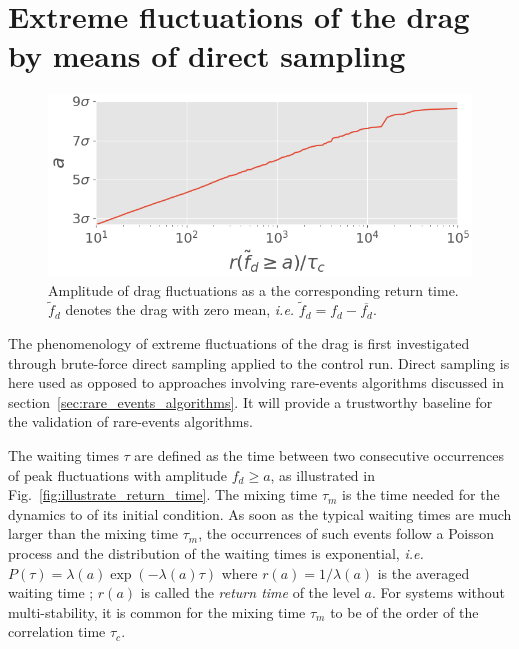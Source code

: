 \documentclass{jfm}
\newcommand{\EL}[1]{{\color{myred}{#1}}}
\begin{document}
\section{Extreme fluctuations of the drag by means of direct sampling}
\label{sec:direct_sampling}



\begin{figure}
	\centering
	\includegraphics[width=.6\linewidth]{return_time/return_time.png}
	\caption{Amplitude of drag fluctuations as a \EL{function of} the corresponding return time. $\tilde{f}_d$ denotes the drag with zero mean, \textit{i.e.} $\tilde{f}_d = f_d - \overline{f_d}$.
	}
	\label{fig:return_time_instant}
\end{figure}

%
The phenomenology of extreme fluctuations of the drag is first investigated through brute-force direct sampling applied to the control run.
Direct sampling is here used as opposed to approaches involving rare-events algorithms discussed in section~\ref{sec:rare_events_algorithms}.
It will provide a trustworthy baseline for the validation of rare-events algorithms. 

The waiting times $\tau$ are defined as the time between two consecutive occurrences of peak fluctuations with amplitude $f_d \geq a$, as illustrated in Fig.~\ref{fig:illustrate_return_time}.
The mixing time $\tau_m$ is the time needed for the dynamics to \EL{lose the memory} of its initial condition.
As soon as the typical waiting times are much larger than the mixing time $\tau_m$, the occurrences of such events follow a Poisson process and the distribution of the waiting times is exponential, \emph{i.e.} $P(\tau)=\lambda(a)\exp(-\lambda(a)\tau)$ where $r(a)=1/\lambda(a)$ is the averaged waiting time \citep{lestang_computing_2018}; $r(a)$ is called the {\it return time} of the level $a$.
For systems without multi-stability, it is common for the mixing time $\tau_m$ to be of the order of the correlation time $\tau_c$.
\end{document}
